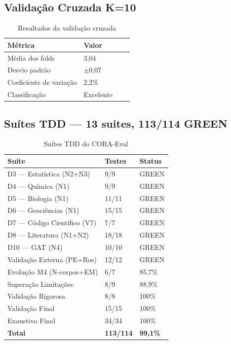 \documentclass[12pt,a4paper,oneside]{article}
\begin{document}
\subsection{Validação Cruzada K=10}

\begin{table}[H]\centering\footnotesize
\caption{Resultados da validação cruzada}
\label{tab:cv}
\begin{tabular}{p{}p{}p{}p{}}
\toprule
\textbf{Métrica} & \textbf{Valor} \\
\midrule
Média dos folds & 3,04 \\
Desvio padrão & $\pm$0,07 \\
Coeficiente de variação & 2,2\% \\
Classificação & Excelente \\
\bottomrule
\end{tabular}
\end{table}

\subsection{Suítes TDD — 13 suites, 113/114 GREEN}

\begin{table}[H]\centering\footnotesize
\caption{Suítes TDD do CORA-Eval}
\label{tab:tdd}
\begin{tabular}{p{}p{}p{}}
\toprule
\textbf{Suite} & \textbf{Testes} & \textbf{Status} \\
\midrule
D3 --- Estatística (N2+N3) & 9/9 & GREEN \\
D4 --- Química (N1) & 9/9 & GREEN \\
D5 --- Biologia (N1) & 11/11 & GREEN \\
D6 --- Geociências (N1) & 15/15 & GREEN \\
D7 --- Código Científico (V7) & 7/7 & GREEN \\
D8 --- Literatura (N1+N2) & 18/18 & GREEN \\
D10 --- GAT (N4) & 10/10 & GREEN \\
Validação Externa (PE+Ros) & 12/12 & GREEN \\
Evolução M4 (N-corpos+EM) & 6/7 & 85,7\% \\
Superação Limitações & 8/9 & 88,9\% \\
Validação Rigorosa & 8/8 & 100\% \\
Validação Final & 15/15 & 100\% \\
Exaustivo Final & 34/34 & 100\% \\
\midrule
\textbf{Total} & \textbf{113/114} & \textbf{99,1\%} \\
\bottomrule
\end{tabular}
\end{table}
\end{document}
